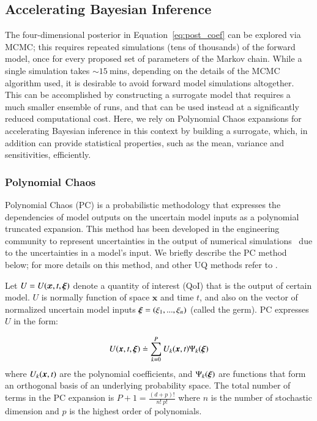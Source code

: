 \subsection{Accelerating Bayesian Inference}
\label{sec:uqpce}


The four-dimensional posterior in Equation~\eqref{eq:post_coef} can be explored via MCMC;
this requires repeated simulations (tens of thousands) of the forward \geoclaw model, 
once for every proposed set of parameters of the Markov chain. While a single \geoclaw simulation
takes $\sim 15~$mins, depending on the details of the MCMC algorithm used, it is desirable 
to avoid forward model simulations altogether. This can be accomplished by constructing a 
surrogate model that requires a much
smaller ensemble of \geoclaw runs, and that can be used instead
at a significantly reduced computational cost.  Here, we rely on
Polynomial Chaos expansions for accelerating Bayesian inference in this context 
by building a surrogate, which, in addition can provide statistical properties, such as the mean, variance and sensitivities, efficiently. 

\subsubsection{Polynomial Chaos}

Polynomial Chaos (PC) is a probabilistic methodology that expresses the 
dependencies of model outputs on the uncertain model inputs
as a polynomial truncated expansion. This method has been developed in 
the engineering community to represent uncertainties in the output of 
numerical simulations~\citep{Villegas2012,Lin2009,Xiu2004}
due to the uncertainties in a model's input. We briefly describe the PC
method below; for more details on this method, and other UQ methods
refer to \citep{LeMaitreKnio2010}.

Let $U=U(\bm{x},t,\xxi)$ denote a quantity of 
interest (QoI) that is the output of certain model.
$U$ is normally function of space $\bm{x}$ and time $t$, and 
also on the vector of normalized uncertain model inputs $\xxi=(\xi_1,...,\xi_n)$ (called the germ). 
PC expresses $U$ in the form:

\begin{equation}
  U(\xbold,t,\xxi) \doteq \sum_{k = 0}^P U_k(\xbold,t) \Psi_k(\xxi)
\label{eq:stochseries}
\end{equation} 
where $U_k(\xbold,t)$ are the polynomial coefficients, and
$\Psi_k(\xxi)$ are functions that form an orthogonal basis of an underlying probability
space. The total number of terms in the PC expansion is
$P+1 = \frac{(d+p)! }{n!\ p!}$ where $n$ is the number of stochastic dimension and $p$ is the highest order
of polynomials. 

